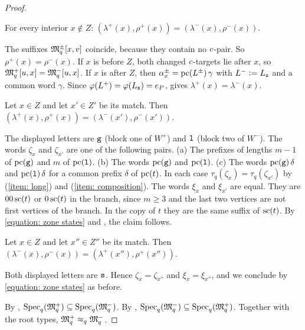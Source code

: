 \begin{proof}
  \begin{claim}\label{claim: outside}
    For every interior $x \notin Z$: $(\lambda^{+}(x), \rho^{+}(x)) = (\lambda^{-}(x), \rho^{-}(x))$.
  \end{claim}
  \begin{claimproof}
    The suffixes $\mathfrak{M}^{\pm}_q[x, v]$ coincide, because they contain no $c$-pair.
    So $\rho^{+}(x) = \rho^{-}(x)$.
    If $x$ is before $Z$, both changed $c$-targets lie after $x$, so $\mathfrak{M}^{+}_q[u, x] = \mathfrak{M}^{-}_q[u, x]$.
    If $x$ is after $Z$, then $\alpha^{\pm}_x = \mathrm{pc}(L^{\pm})\, \gamma$ with $L^{-} \mathrel{\vcentcolon=} L_{\mathtt{s}}$ and a common word $\gamma$.
    Since $\varphi(L^{+}) = \varphi(L_{\mathtt{s}}) = e_P$,  gives $\lambda^{+}(x) = \lambda^{-}(x)$.
  \end{claimproof}

  \begin{claim}\label{claim: good to long}
    Let $x \in Z$ and let $x' \in Z'$ be its match.
    Then $(\lambda^{+}(x), \rho^{+}(x)) = (\lambda^{-}(x'), \rho^{-}(x'))$.
  \end{claim}
  \begin{claimproof}
    The displayed letters are $\mathtt{g}$ (block one of $W^{+}$) and $\mathtt{l}$ (block two of $W^{-}$).
    The words $\zeta_x$ and $\zeta_{x'}$ are one of the following pairs.
    (a) The prefixes of lengths $m-1$ of $\mathrm{pc}(\mathtt{g})$ and $m$ of $\mathrm{pc}(\mathtt{l})$.
    (b) The words $\mathrm{pc}(\mathtt{g})$ and $\mathrm{pc}(\mathtt{l})$.
    (c) The words $\mathrm{pc}(\mathtt{g})\,\delta$ and $\mathrm{pc}(\mathtt{l})\,\delta$ for a common prefix $\delta$ of $\mathrm{pc}(t)$.
    In each case $\tau_q(\zeta_x) = \tau_q(\zeta_{x'})$ by (\ref{item: long}) and (\ref{item: composition}).
    The words $\xi_x$ and $\xi_{x'}$ are equal.
    They are $00\,\mathrm{sc}(t)$ or $0\,\mathrm{sc}(t)$ in the branch, since $m \ge 3$ and the last two vertices are not first vertices of the branch.
    In the copy of $t$ they are the same suffix of $\mathrm{sc}(t)$.
    By \eqref{equation: zone states} and , the claim follows.
  \end{claimproof}

  \begin{claim}\label{claim: shifted to shifted}
    Let $x \in Z$ and let $x'' \in Z''$ be its match.
    Then $(\lambda^{-}(x), \rho^{-}(x)) = (\lambda^{+}(x''), \rho^{+}(x''))$.
  \end{claim}
  \begin{claimproof}
    Both displayed letters are $\mathtt{s}$.
    Hence $\zeta_x = \zeta_{x''}$ and $\xi_x = \xi_{x''}$, and we conclude by \eqref{equation: zone states} as before.
  \end{claimproof}

  By , $\mathrm{Spec}_{q}(\mathfrak{M}^{+}_q) \subseteq \mathrm{Spec}_{q}(\mathfrak{M}^{-}_q)$.
  By , $\mathrm{Spec}_{q}(\mathfrak{M}^{-}_q) \subseteq \mathrm{Spec}_{q}(\mathfrak{M}^{+}_q)$.
  Together with the root types, $\mathfrak{M}^{+}_q \approx_{q} \mathfrak{M}^{-}_q$.
\end{proof}

